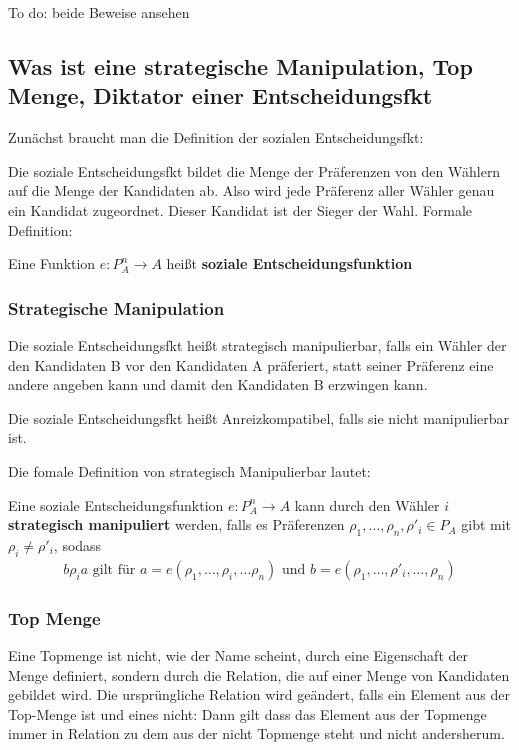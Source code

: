 \documentclass[]{article}
\begin{document}
To do: beide Beweise ansehen

\subsection*{Was ist eine strategische Manipulation, Top Menge, Diktator einer Entscheidungsfkt}

Zunächst braucht man die Definition der sozialen Entscheidungsfkt:

Die soziale Entscheidungsfkt bildet die Menge der Präferenzen von den Wählern auf die Menge der Kandidaten ab. Also wird jede Präferenz aller Wähler genau ein Kandidat zugeordnet. Dieser Kandidat ist der Sieger der Wahl. Formale Definition: 

  Eine Funktion $ e : P_A^n \to A$  heißt \textbf{soziale Entscheidungsfunktion}


\subsubsection*{Strategische Manipulation}
 Die soziale Entscheidungsfkt heißt strategisch manipulierbar, falls ein Wähler der den Kandidaten B vor den Kandidaten A präferiert, statt seiner Präferenz eine andere angeben kann und damit den Kandidaten B erzwingen kann. 
 
 Die soziale Entscheidungsfkt heißt Anreizkompatibel, falls sie nicht manipulierbar ist. 
 
 Die fomale Definition von strategisch Manipulierbar lautet: 

 Eine soziale Entscheidungsfunktion $e : P_A^n \to A$ kann durch den Wähler $i$ \textbf{strategisch manipuliert} werden, falls es Präferenzen $\rho_1, \dots, \rho_n, \rho'_i \in P_A$ gibt mit $\rho_i \neq \rho'_i$, sodass
 \begin{align*}
 b \rho_i a \text{ gilt für }  a = e(\rho_1, \dots, \rho_i, \dots \rho_n) \text{ und } b= e(\rho_1, \dots, \rho'_i, \dots, \rho_n)
 \end{align*}
 
\subsubsection*{Top Menge} 
Eine Topmenge ist nicht, wie der Name scheint, durch eine Eigenschaft der Menge definiert, sondern durch die Relation, die auf einer Menge von Kandidaten gebildet wird. Die ursprüngliche Relation wird geändert, falls ein Element aus der Top-Menge ist und eines nicht: Dann gilt dass das Element aus der Topmenge immer in Relation zu dem aus der nicht Topmenge steht und nicht andersherum. 
\end{document}
